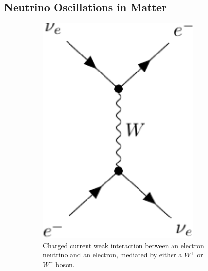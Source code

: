 \subsection{Neutrino Oscillations in Matter}

\begin{figure}
    \centering
    \begin{subfigure}{0.3\textwidth}
        \includegraphics[width=0.9\textwidth]{figures/w-boson.pdf} 
        \caption{Charged current weak interaction between an electron neutrino and an electron,
        mediated by either a $W^+$ or $W^-$ boson.}
    \end{subfigure}
    \quad
    \begin{subfigure}{0.3\textwidth}
        \vspace{1em}

\end{subfigure}
\end{figure}
